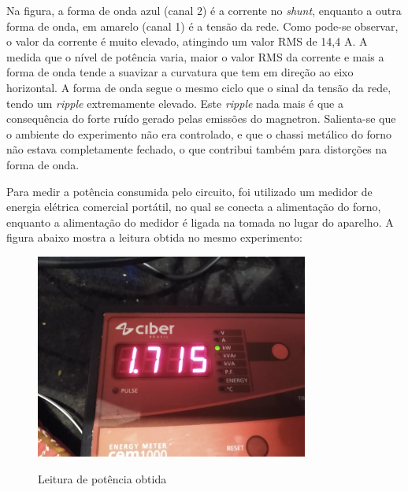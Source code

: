 Na figura, a forma de onda azul (canal 2) é a corrente no \textit{shunt}, enquanto a outra forma de onda, em amarelo (canal 1) é a tensão da rede. Como pode-se observar, o valor da corrente é muito elevado, atingindo um valor RMS de 14,4 A.  A medida que o nível de potência varia, maior o valor RMS da corrente e mais a forma de onda tende a suavizar a curvatura que tem em direção ao eixo horizontal. A forma de onda segue o mesmo ciclo que o sinal da tensão da rede, tendo um \textit{ripple} extremamente elevado. Este \textit{ripple} nada mais é que a consequência do forte ruído gerado pelas emissões do magnetron. Salienta-se que o ambiente do experimento não era controlado, e que o chassi metálico do forno não estava completamente fechado, o que contribui também para distorções na forma de onda.

Para medir a potência consumida pelo circuito, foi utilizado um medidor de energia elétrica comercial portátil, no qual se conecta a alimentação do forno, enquanto a alimentação do medidor é ligada na tomada no lugar do aparelho. A figura abaixo mostra a leitura obtida no mesmo experimento:

\begin{figure}[H]
    \centering
    \caption{Leitura de potência obtida}
    \includegraphics[width=0.8\textwidth]{./dados/figuras/medida_potencia_full}
    \label{fig:figura-medida_potencia_full}
\end{figure}

